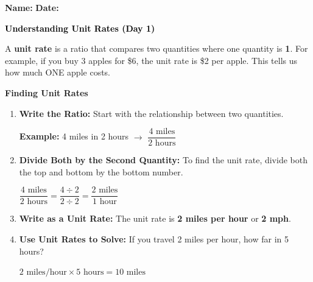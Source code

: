 \documentclass[12pt, letterpaper, fleqn]{article}
\begin{document}
\textbf{Name:} \underline{\hspace{5cm}}
\hfill
\textbf{Date:} \underline{\hspace{3cm}}\\

\begin{tcolorbox}[colback=customteal!20]
    \large\textcolor{black}{\textbf{Understanding Unit Rates (Day 1)}}
\end{tcolorbox}

\vspace{4mm}

\noindent
A \textbf{unit rate} is a ratio that compares two quantities where one quantity is \textbf{1}. 
For example, if you buy 3 apples for \$6, the unit rate is \$2 per apple. This tells us how much ONE apple costs.

\vspace{4mm}

\begin{tcolorbox}[
    colback=white,
    colframe=black!25,
    boxrule=0.6pt,
    arc=4mm,
    left=6mm,
    right=6mm,
    top=5mm,
    bottom=5mm
]
\textbf{Finding Unit Rates}
\begin{enumerate}[leftmargin=8mm, itemsep=4mm]
    \item \textbf{Write the Ratio:} Start with the relationship between two quantities.
    
    \textbf{Example:} 4 miles in 2 hours $\rightarrow$ $\dfrac{4 \text{ miles}}{2 \text{ hours}}$

    \item \textbf{Divide Both by the Second Quantity:} To find the unit rate, divide both the top and bottom by the bottom number.
    
    $\dfrac{4 \text{ miles}}{2 \text{ hours}} = \dfrac{4 \div 2}{2 \div 2} = \dfrac{2 \text{ miles}}{1 \text{ hour}}$
    
    \item \textbf{Write as a Unit Rate:} The unit rate is \textbf{2 miles per hour} or \textbf{2 mph}.

    \item \textbf{Use Unit Rates to Solve:} If you travel 2 miles per hour, how far in 5 hours?
    
    $2 \text{ miles/hour} \times 5 \text{ hours} = 10 \text{ miles}$
\end{enumerate}
\end{tcolorbox}
\end{document}
